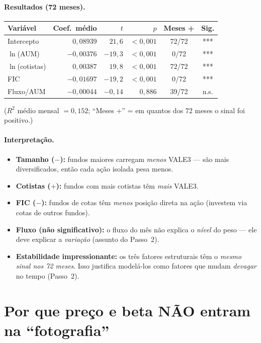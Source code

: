 \documentclass[11pt]{article}
\begin{document}
\paragraph{Resultados (72 meses).}
\begin{table}[h]\centering
\begin{tabular}{@{}lrrrcc@{}}
\toprule
Variável & Coef.\ médio & $t$ & $p$ & Meses + & Sig. \\
\midrule
Intercepto       & $0{,}08939$  & $21{,}6$  & $<0{,}001$ & 72/72 & *** \\
$\ln$(AUM)       & $-0{,}00376$ & $-19{,}3$ & $<0{,}001$ & 0/72  & *** \\
$\ln$(cotistas)  & $0{,}00387$  & $19{,}8$  & $<0{,}001$ & 72/72 & *** \\
FIC              & $-0{,}01697$ & $-19{,}2$ & $<0{,}001$ & 0/72  & *** \\
Fluxo/AUM        & $-0{,}00044$ & $-0{,}14$ & $0{,}886$  & 39/72 & n.s. \\
\bottomrule
\end{tabular}
\end{table}
\noindent ($R^2$ médio mensal $=0{,}152$; ``Meses +'' = em quantos dos 72 meses o
sinal foi positivo.)

\paragraph{Interpretação.}
\begin{itemize}[noitemsep]
\item \textbf{Tamanho ($-$):} fundos maiores carregam \emph{menos} VALE3 --- são mais
diversificados, então cada ação isolada pesa menos.
\item \textbf{Cotistas ($+$):} fundos com mais cotistas têm \emph{mais} VALE3.
\item \textbf{FIC ($-$):} fundos de cotas têm \emph{menos} posição direta na ação
(investem via cotas de outros fundos).
\item \textbf{Fluxo (não significativo):} o fluxo do mês não explica o \emph{nível}
do peso --- ele deve explicar a \emph{variação} (assunto do Passo~2).
\item \textbf{Estabilidade impressionante:} os três fatores estruturais têm o
\emph{mesmo sinal nos 72 meses}. Isso justifica modelá-los como fatores que mudam
\emph{devagar} no tempo (Passo~2).
\end{itemize}

\section{Por que preço e beta NÃO entram na ``fotografia''}
\end{document}
